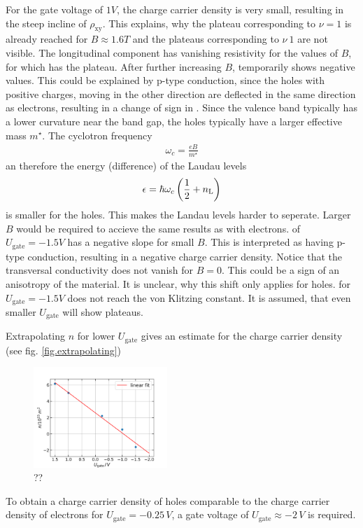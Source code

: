 For the gate voltage of $1V$, the charge carrier density is very small, resulting in the steep incline of $\rho_\text{xy}$.
This explains, why the plateau corresponding to $\nu=1$ is already reached for $B\approx1.6T$ and 
the plateaus corresponding to  $\nu\>1$ are not visible.
The longitudinal component has vanishing resistivity for the values of $B$, for which \rhall has the plateau.  
After further increasing $B$, \rhall temporarily shows negative values.
This could be explained by p-type conduction, since the holes with positive charges, 
moving in the other direction are deflected in the same direction as electrons, resulting in a change of sign in \rhall.
Since the valence band typically has a lower curvature near the band gap, the holes typically have a larger effective mass $m^\star$.
The cyclotron frequency
\begin{align}
    \omega_c = \frac{eB}{m^\star}    
\end{align}
an therefore the energy (difference) of the Laudau levels
\begin{align}
    \epsilon = \hbar \omega_c \left(\frac{1}{2} + n_\text L \right)
\end{align}
is smaller for the holes.
This makes the Landau levels harder to seperate. 
Larger $B$ would be required to accieve the same results as with electrons.
\rhall of $U_\text{gate} = -1.5V$ has a negative slope for small $B$.
This is interpreted as having p-type conduction, resulting in a negative charge carrier density.
Notice that the transversal conductivity does not vanish for $B=0$.
This could be a sign of an anisotropy of the material.
It is unclear, why this shift only applies for holes.
\rhall for $U_\text{gate} = -1.5V$ does not reach the von Klitzing constant.
It is assumed, that even smaller $U_\text{gate}$ will show plateaus. 

Extrapolating $n$ for lower $U_\text{gate}$ gives an estimate for the charge carrier density (see fig. \ref{fig.extrapolating})
\begin{figure}[h]
    \centering
    \includegraphics[width=0.45\textwidth]{../Images/extrapolatingN.png}
    \caption{??}
    \label{fig:extrapolating}
\end{figure}
To obtain a charge carrier density of holes comparable to the charge carrier density of electrons for $U_\text{gate} = -0.25\,V$,
a gate voltage of $U_\text{gate} \approx -2\,V$ is required.


